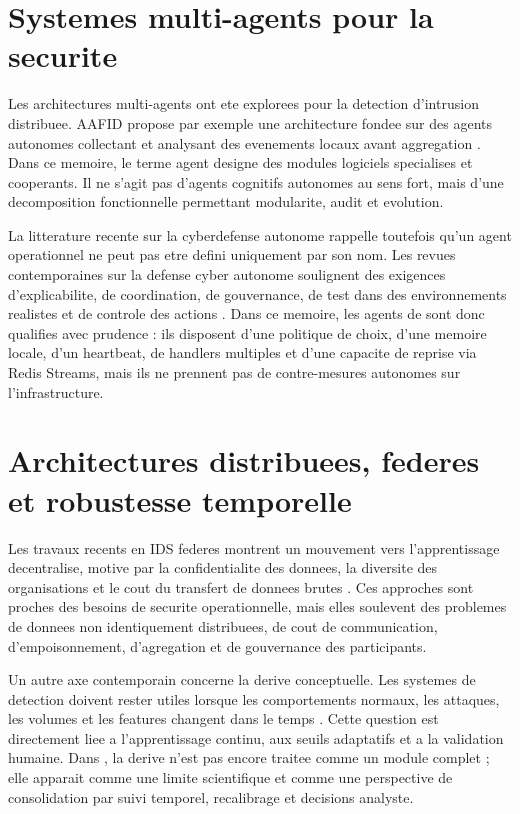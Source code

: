 \section{Systemes multi-agents pour la securite}
Les architectures multi-agents ont ete explorees pour la detection d'intrusion distribuee. AAFID propose par exemple une architecture fondee sur des agents autonomes collectant et analysant des evenements locaux avant aggregation \cite{balasubramaniyan1998aafid}. Dans ce memoire, le terme agent designe des modules logiciels specialises et cooperants. Il ne s'agit pas d'agents cognitifs autonomes au sens fort, mais d'une decomposition fonctionnelle permettant modularite, audit et evolution.

La litterature recente sur la cyberdefense autonome rappelle toutefois qu'un agent operationnel ne peut pas etre defini uniquement par son nom. Les revues contemporaines sur la defense cyber autonome soulignent des exigences d'explicabilite, de coordination, de gouvernance, de test dans des environnements realistes et de controle des actions \cite{vyas2026acnd}. Dans ce memoire, les agents de \logminer{} sont donc qualifies avec prudence : ils disposent d'une politique de choix, d'une memoire locale, d'un heartbeat, de handlers multiples et d'une capacite de reprise via Redis Streams, mais ils ne prennent pas de contre-mesures autonomes sur l'infrastructure.

\section{Architectures distribuees, federes et robustesse temporelle}
Les travaux recents en IDS federes montrent un mouvement vers l'apprentissage decentralise, motive par la confidentialite des donnees, la diversite des organisations et le cout du transfert de donnees brutes \cite{khraisat2024federatedids,makris2025fids}. Ces approches sont proches des besoins de securite operationnelle, mais elles soulevent des problemes de donnees non identiquement distribuees, de cout de communication, d'empoisonnement, d'agregation et de gouvernance des participants.

Un autre axe contemporain concerne la derive conceptuelle. Les systemes de detection doivent rester utiles lorsque les comportements normaux, les attaques, les volumes et les features changent dans le temps \cite{shyaa2024conceptdrift}. Cette question est directement liee a l'apprentissage continu, aux seuils adaptatifs et a la validation humaine. Dans \logminer{}, la derive n'est pas encore traitee comme un module complet ; elle apparait comme une limite scientifique et comme une perspective de consolidation par suivi temporel, recalibrage et decisions analyste.


